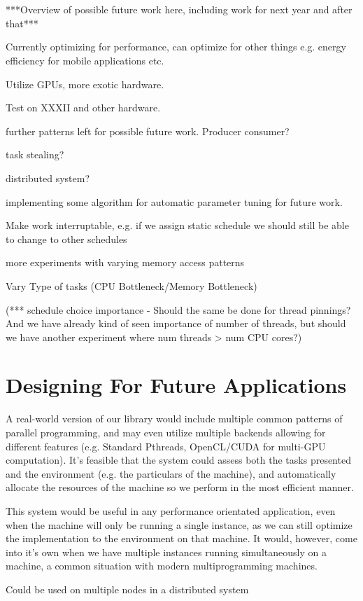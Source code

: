 \section{}

***Overview of possible future work here, including work for next year and after that***

Currently optimizing for performance, can  optimize for other things e.g. energy efficiency for mobile applications etc.

Utilize GPUs, more exotic hardware.

Test on XXXII and other hardware.

further patterns left for possible future work. Producer consumer?

task stealing?

distributed system?

implementing some algorithm for automatic parameter tuning for future work.

Make work interruptable, e.g. if we assign static schedule we should still be able to change to other schedules

more experiments with varying memory access patterns

Vary Type of tasks (CPU Bottleneck/Memory Bottleneck) 

(*** schedule choice importance - Should the same be done for thread pinnings? And we have already kind of seen importance of number of threads, but should we have another experiment where num threads > num CPU cores?)

\section{Designing For Future Applications}

A real-world version of our library would include multiple common patterns of parallel programming, and may even utilize multiple backends allowing for different features (e.g. Standard Pthreads, OpenCL/CUDA for multi-GPU computation). It's feasible that the system could assess both the tasks presented and the environment (e.g. the particulars of the machine), and automatically allocate the resources of the machine so we perform in the most efficient manner.

This system would be useful in any performance orientated application, even when the machine will only be running a single instance, as we can still optimize the implementation to the environment on that machine. It would, however, come into it's own when we have multiple instances running simultaneously on a machine, a common situation with modern multiprogramming machines.

Could be used on multiple nodes in a distributed system